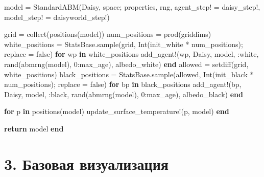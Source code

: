\documentclass[
  english,
  russian,
  12pt,
  a4paper,
  DIV=11,
  numbers=noendperiod]{scrreprt}
\newenvironment{Shaded}{\begin{snugshade}}{\end{snugshade}}
\newcommand{\ConstantTok}[1]{\textcolor[rgb]{0.56,0.35,0.01}{#1}}
\newcommand{\ControlFlowTok}[1]{\textcolor[rgb]{0.00,0.23,0.31}{\textbf{#1}}}
\newcommand{\FloatTok}[1]{\textcolor[rgb]{0.68,0.00,0.00}{#1}}
\newcommand{\FunctionTok}[1]{\textcolor[rgb]{0.28,0.35,0.67}{#1}}
\newcommand{\KeywordTok}[1]{\textcolor[rgb]{0.00,0.23,0.31}{\textbf{#1}}}
\newcommand{\NormalTok}[1]{\textcolor[rgb]{0.00,0.23,0.31}{#1}}
\newcommand{\OperatorTok}[1]{\textcolor[rgb]{0.37,0.37,0.37}{#1}}
\begin{document}
\begin{Shaded}
\begin{Highlighting}[]
\NormalTok{    model }\OperatorTok{=} \FunctionTok{StandardABM}\NormalTok{(Daisy, space; properties, rng, agent\_step! }\OperatorTok{=}\NormalTok{ daisy\_step!, model\_step! }\OperatorTok{=}\NormalTok{ daisyworld\_step!)}

\NormalTok{    grid }\OperatorTok{=} \FunctionTok{collect}\NormalTok{(}\FunctionTok{positions}\NormalTok{(model))}
\NormalTok{    num\_positions }\OperatorTok{=} \FunctionTok{prod}\NormalTok{(griddims)}
\NormalTok{    white\_positions }\OperatorTok{=}
\NormalTok{        StatsBase.}\FunctionTok{sample}\NormalTok{(grid, }\FunctionTok{Int}\NormalTok{(init\_white }\OperatorTok{*}\NormalTok{ num\_positions); replace }\OperatorTok{=} \ConstantTok{false}\NormalTok{)}
    \ControlFlowTok{for}\NormalTok{ wp }\KeywordTok{in}\NormalTok{ white\_positions}
        \FunctionTok{add\_agent!}\NormalTok{(wp, Daisy, model, }\OperatorTok{:}\NormalTok{white, }\FunctionTok{rand}\NormalTok{(}\FunctionTok{abmrng}\NormalTok{(model), }\FloatTok{0}\OperatorTok{:}\NormalTok{max\_age), albedo\_white)}
    \ControlFlowTok{end}
\NormalTok{    allowed }\OperatorTok{=} \FunctionTok{setdiff}\NormalTok{(grid, white\_positions)}
\NormalTok{    black\_positions }\OperatorTok{=}
\NormalTok{        StatsBase.}\FunctionTok{sample}\NormalTok{(allowed, }\FunctionTok{Int}\NormalTok{(init\_black }\OperatorTok{*}\NormalTok{ num\_positions); replace }\OperatorTok{=} \ConstantTok{false}\NormalTok{)}
    \ControlFlowTok{for}\NormalTok{ bp }\KeywordTok{in}\NormalTok{ black\_positions}
        \FunctionTok{add\_agent!}\NormalTok{(bp, Daisy, model, }\OperatorTok{:}\NormalTok{black, }\FunctionTok{rand}\NormalTok{(}\FunctionTok{abmrng}\NormalTok{(model), }\FloatTok{0}\OperatorTok{:}\NormalTok{max\_age), albedo\_black)}
    \ControlFlowTok{end}

    \ControlFlowTok{for}\NormalTok{ p }\KeywordTok{in} \FunctionTok{positions}\NormalTok{(model)}
        \FunctionTok{update\_surface\_temperature!}\NormalTok{(p, model)}
    \ControlFlowTok{end}

    \ControlFlowTok{return}\NormalTok{ model}
\ControlFlowTok{end}
\end{Highlighting}
\end{Shaded}

\section{3. Базовая
визуализация}\label{ux431ux430ux437ux43eux432ux430ux44f-ux432ux438ux437ux443ux430ux43bux438ux437ux430ux446ux438ux44f}
\end{document}
